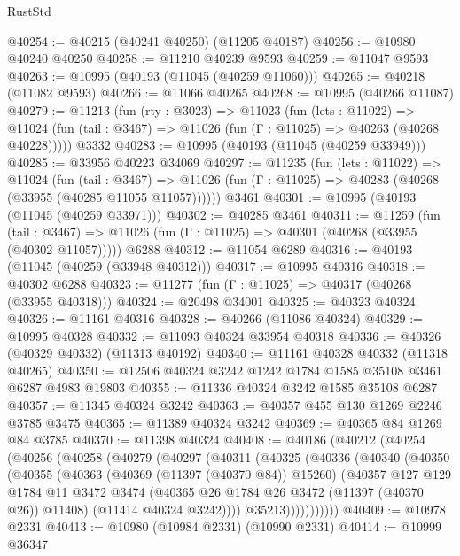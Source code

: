 \begin{lexlean}{RustStd}
\begin{coremodule}
@40254 := @40215 (@40241 @40250) (@11205 @40187)
@40256 := @10980 @40240 @40250
@40258 := @11210 @40239 @9593
@40259 := @11047 @9593
@40263 := @10995 (@40193 (@11045 (@40259 @11060)))
@40265 := @40218 (@11082 @9593)
@40266 := @11066 @40265
@40268 := @10995 (@40266 @11087)
@40279 := @11213
    (fun (rty : @3023) =>
    @11023
      (fun (lets : @11022) =>
      @11024 (fun (tail : @3467) => @11026 (fun (Γ : @11025) => @40263 (@40268 @40228)))))
    @3332
@40283 := @10995 (@40193 (@11045 (@40259 @33949)))
@40285 := @33956 @40223 @34069
@40297 := @11235
    (fun (lets : @11022) =>
    @11024
      (fun (tail : @3467) =>
      @11026 (fun (Γ : @11025) => @40283 (@40268 (@33955 (@40285 @11055 @11057))))))
    @3461
@40301 := @10995 (@40193 (@11045 (@40259 @33971)))
@40302 := @40285 @3461
@40311 := @11259
    (fun (tail : @3467) => @11026 (fun (Γ : @11025) => @40301 (@40268 (@33955 (@40302 @11057)))))
    @6288
@40312 := @11054 @6289
@40316 := @40193 (@11045 (@40259 (@33948 @40312)))
@40317 := @10995 @40316
@40318 := @40302 @6288
@40323 := @11277 (fun (Γ : @11025) => @40317 (@40268 (@33955 @40318)))
@40324 := @20498 @34001
@40325 := @40323 @40324
@40326 := @11161 @40316
@40328 := @40266 (@11086 @40324)
@40329 := @10995 @40328
@40332 := @11093 @40324 @33954 @40318
@40336 := @40326 (@40329 @40332) (@11313 @40192)
@40340 := @11161 @40328 @40332 (@11318 @40265)
@40350 := @12506 @40324 @3242 @1242 @1784 @1585 @35108 @3461 @6287 @4983 @19803
@40355 := @11336 @40324 @3242 @1585 @35108 @6287
@40357 := @11345 @40324 @3242
@40363 := @40357 @455 @130 @1269 @2246 @3785 @3475
@40365 := @11389 @40324 @3242
@40369 := @40365 @84 @1269 @84 @3785
@40370 := @11398 @40324
@40408 := @40186
    (@40212
      (@40254
        (@40256
          (@40258
            (@40279
              (@40297
                (@40311
                  (@40325
                    (@40336
                      (@40340
                        (@40350
                          (@40355
                            (@40363
                              (@40369 (@11397 (@40370 @84)) @15260)
                              (@40357
                                @127
                                @129
                                @1784
                                @11
                                @3472
                                @3474
                                (@40365 @26 @1784 @26 @3472 (@11397 (@40370 @26)) @11408)
                                (@11414 @40324 @3242))))
                          @35213)))))))))))
@40409 := @10978 @2331
@40413 := @10980 (@10984 @2331) (@10990 @2331)
@40414 := @10999 @36347

\end{coremodule}
\end{lexlean}
